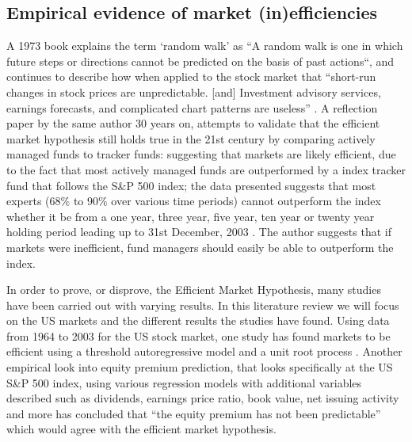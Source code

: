 \subsection{Empirical evidence of market (in)efficiencies}
A 1973 book explains the term `random walk' as ``A random walk is one in which future steps or directions cannot be predicted on the basis of past actions``, and continues to describe how when applied to the stock market that ``short-run changes in stock prices are unpredictable. [and] Investment advisory services, earnings forecasts, and complicated chart patterns are useless'' \parencite[24]{burton_gordon_malkiel_2016}.
A reflection paper by the same author 30 years on, attempts to validate that the efficient market hypothesis still holds true in the 21st century by comparing actively managed funds to tracker funds: suggesting that markets are likely efficient, due to the fact that most actively managed funds are outperformed by a index tracker fund that follows the S\&P 500 index; the data presented suggests that most experts (68\% to 90\% over various time periods) cannot outperform the index whether it be from a one year, three year, five year, ten year or twenty year holding period leading up to 31st December, 2003 \parencite{reflections30years}. The author suggests that if markets were inefficient, fund managers should easily be able to outperform the index.

In order to prove, or disprove, the Efficient Market Hypothesis, many studies have been carried out with varying results. In this literature review we will focus on the US markets and the different results the studies have found. Using data from 1964 to 2003 for the US stock market, one study has found markets to be efficient using a threshold autoregressive model and a unit root process \parencite{narayan2006behaviour}. Another empirical look into equity premium prediction, that looks specifically at the US S\&P 500 index, using various regression models with additional variables described such as dividends, earnings price ratio, book value, net issuing activity and more has concluded that ``the equity premium has not been predictable'' \parencite[abstract]{goval_welch_2004} which would agree with the efficient market hypothesis.



